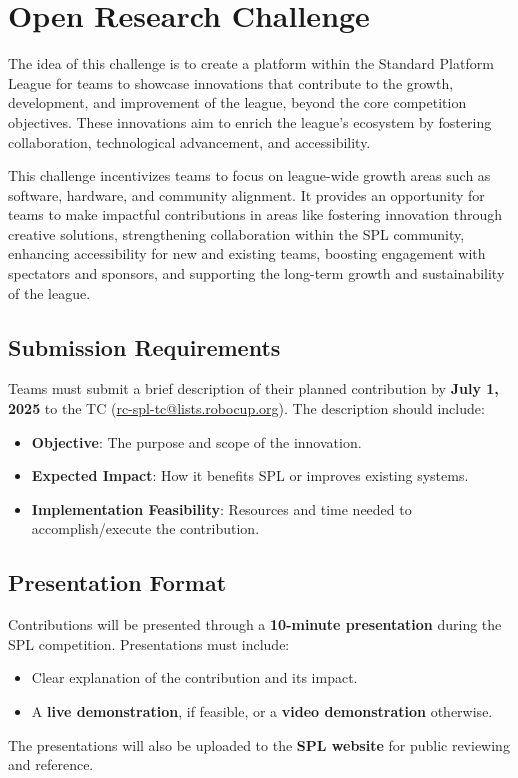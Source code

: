 \section{Open Research Challenge}
The idea of this challenge is to create a platform within the Standard Platform League for teams to showcase innovations that contribute to the growth, development, and improvement of the league, beyond the core competition objectives. These innovations aim to enrich the league's ecosystem by fostering collaboration, technological advancement, and accessibility.

This challenge incentivizes teams to focus on league-wide growth areas such as software, hardware, and community alignment. It provides an opportunity for teams to make impactful contributions in areas like fostering innovation through creative solutions, strengthening collaboration within the SPL community, enhancing accessibility for new and existing teams, boosting engagement with spectators and sponsors, and supporting the long-term growth and sustainability of the league.

\subsection{Submission Requirements}
Teams must submit a brief description of their planned contribution by \textbf{July 1, 2025} to the TC (\url{rc-spl-tc@lists.robocup.org}).
The description should include:
    \begin{itemize}
        \item \textbf{Objective}: The purpose and scope of the innovation.
        \item \textbf{Expected Impact}: How it benefits SPL or improves existing systems.
        \item \textbf{Implementation Feasibility}: Resources and time needed to accomplish/execute the contribution.
    \end{itemize}

\subsection{Presentation Format}
Contributions will be presented through a \textbf{10-minute presentation} during the SPL competition.
Presentations must include:
\begin{itemize}
    \item Clear explanation of the contribution and its impact.
    \item A \textbf{live demonstration}, if feasible, or a \textbf{video demonstration} otherwise.
\end{itemize}
The presentations will also be uploaded to the \textbf{SPL website} for public reviewing and reference.

